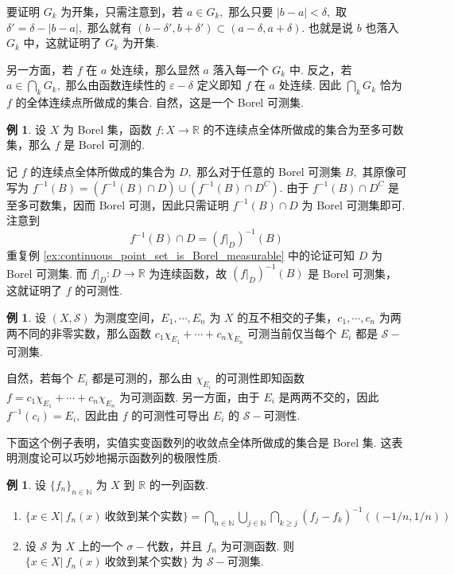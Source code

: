 \documentclass[12pt, a4paper, oneside]{book}
\numberwithin{figure}{section}
\theoremstyle{definition}
\newtheorem{example}[theorem]{例}
\begin{document}
要证明 $G_k$ 为开集，只需注意到，若 $a\in G_k,$ 那么只要 $|b-a|<\delta,$ 取 $\delta'=\delta-|b-a|,$ 那么就有 
$(b-\delta',b+\delta')\subset (a-\delta,a+\delta).$ 也就是说 $b$ 也落入 $G_k$ 中，这就证明了 $G_k$ 为开集. 

另一方面，若 $f$ 在 $a$ 处连续，那么显然 $a$ 落入每一个 $G_k$ 中. 反之，若 $a\in\bigcap_k G_k,$ 那么由函数连续性的 $\varepsilon-\delta$ 定义即知 $f$ 在 $a$ 处连续. 
因此 $\bigcap_k G_k$ 恰为 $f$ 的全体连续点所做成的集合. 自然，这是一个 Borel 可测集.

\begin{example}
    设 $X$ 为 Borel 集，函数 $f:X\to\mathbb R$ 的不连续点全体所做成的集合为至多可数集，那么 $f$ 是 Borel 可测的.
\end{example}

记 $f$ 的连续点全体所做成的集合为 $D,$ 那么对于任意的 Borel 可测集 $B,$ 其原像可写为
$f^{-1}(B)=(f^{-1}(B)\cap D)\cup (f^{-1}(B)\cap D^C).$ 由于 $f^{-1}(B)\cap D^C$ 是至多可数集，因而 Borel 可测，因此只需证明 $f^{-1}(B)\cap D$ 为 Borel 可测集即可. 注意到
\begin{equation}
    f^{-1}(B)\cap D=(f|_D)^{-1}(B)
\end{equation}
重复例 \ref{ex:continuous_point_set_is_Borel_measurable} 中的论证可知 $D$ 为 Borel 可测集.
而 $f|_D:D\to\mathbb R$ 为连续函数，故 $(f|_D)^{-1}(B)$ 是 Borel 可测集，这就证明了 $f$ 的可测性.


\begin{example}
    设 $(X,\mathcal S)$ 为测度空间，$E_1,\cdots,E_n$ 为 $X$ 的互不相交的子集，$c_1,\cdots,c_n$ 为两两不同的非零实数，那么函数 $c_1\chi_{E_1}+\cdots+c_n\chi_{E_n}$ 可测当前仅当每个 $E_i$ 都是 $\mathcal S-$可测集.
\end{example}

自然，若每个 $E_i$ 都是可测的，那么由 $\chi_{E_i}$ 的可测性即知函数 $f=c_1\chi_{E_1}+\cdots+c_n\chi_{E_n}$ 为可测函数. 
另一方面，由于 $E_i$ 是两两不交的，因此 $f^{-1}(c_i)=E_i,$ 因此由 $f$ 的可测性可导出 $E_i$ 的 $\mathcal S-$可测性.

下面这个例子表明，实值实变函数列的收敛点全体所做成的集合是 Borel 集. 这表明测度论可以巧妙地揭示函数列的极限性质.
\begin{example}
    设 $\{f_n\}_{n\in\mathbb N}$ 为 $X$ 到 $\mathbb R$ 的一列函数. 
    \begin{enumerate}[label=\alph*)]
        \item $\{x\in X|\ f_n(x)\ \text{收敛到某个实数}\}=\bigcap_{n\in\mathbb N}\bigcup_{j\in\mathbb N}\bigcap_{k\geq j} (f_j-f_k)^{-1}((-1/n,1/n))$
        \item 设 $\mathcal S$ 为 $X$ 上的一个 $\sigma-$代数，并且 $f_n$ 为可测函数. 则 $\{x\in X|\ f_n(x)\ \text{收敛到某个实数}\}$ 为 $\mathcal S-$可测集.
    \end{enumerate}
\end{example}
\end{document}
